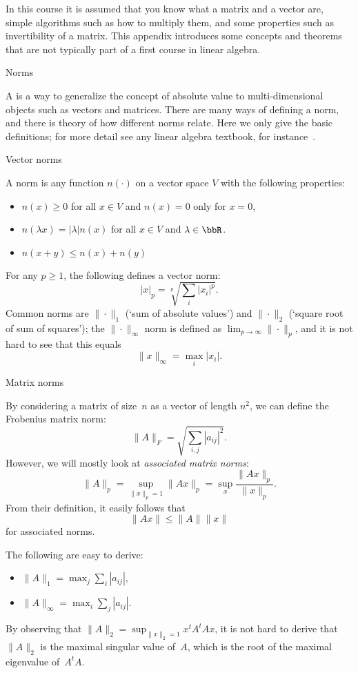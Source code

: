 In this course it is assumed that you know what a matrix and a vector
are, simple algorithms such as how to multiply them, and some
properties such as invertibility of a matrix. This appendix introduces
some concepts and theorems that are not typically part of a first
course in linear algebra.

 {Norms}

A  is a way to generalize the concept of absolute
value to multi-dimensional objects such as vectors and matrices. There
are many ways of defining a norm, and there is theory of how different
norms relate. Here we only give the basic definitions; for more detail
see any linear algebra textbook, for instance~\cite{golo83}.

 {Vector norms}

A norm is any function $n(\cdot)$ on a vector space $V$ with the
following properties:
\begin{itemize}
\item $n(x)\geq0$ for all $x\in V$ and $n(x)=0$ only for $x=0$,
\item $n(\lambda x)=|\lambda|n(x)$ for all $x\in V$ and
  $\lambda\in\bbR$.
\item $n(x+y)\leq n(x)+n(y)$
\end{itemize}
For any $p\geq1$, the following defines a vector norm:
\[ |x|_p = \sqrt[p]{\sum_i|x_i|^p}. \]
Common norms are $\|\cdot\|_1$ (`sum of absolute values') and
$\|\cdot\|_2$ (`square root of sum of squares'); the
$\|\cdot\|_\infty$ norm is defined as
$\lim_{p\rightarrow\infty}\|\cdot\|_p$, and it is not hard to see that
this equals
\[ \|x\|_\infty=\max_i |x_i|. \]


 {Matrix norms}

By considering a matrix of size~$n$ as a vector of length $n^2$, we
can define the Frobenius matrix norm:
\[ \|A\|_F=\sqrt{\sum_{i,j}|a_{ij}|^2}. \]
However, we will mostly look at \emph{associated matrix
  norms}:
\[ \|A\|_p=\sup_{\|x\|_p=1}\|Ax\|_p=
   \sup_x\frac{\|Ax\|_p}{\|x\|_p}.
\]
From their definition, it easily follows that 
\[ \|Ax\|\leq\|A\|\|x\| \]
for associated norms.

The following are easy to derive:
\begin{itemize}
\item $\|A\|_1=\max_j\sum_i|a_{ij}|$,
\item $\|A\|_\infty=\max_i\sum_j|a_{ij}|$.
\end{itemize}
By observing that $\|A\|_2=\sup_{\|x\|_2=1} x^tA^tAx$, it is not hard
to derive that $\|A\|_2$ is the maximal singular value of~$A$, which
is the root of the maximal eigenvalue of~$A^tA$.

